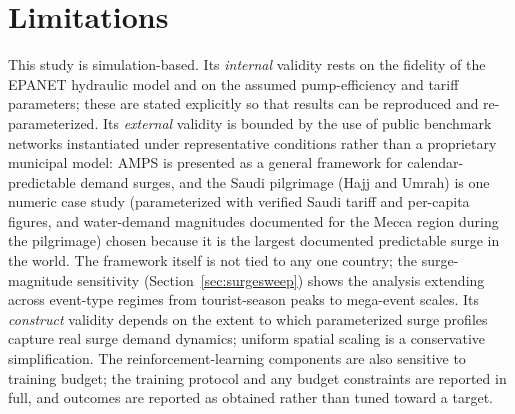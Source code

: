 \documentclass[11pt,a4paper]{article}
\begin{document}
\section{Limitations}
\label{sec:limitations}
This study is simulation-based. Its \emph{internal} validity rests on the
fidelity of the EPANET hydraulic model and on the assumed pump-efficiency and
tariff parameters; these are stated explicitly so that results can be
reproduced and re-parameterized. Its \emph{external} validity is bounded by the
use of public benchmark networks instantiated under representative conditions
rather than a proprietary municipal model: AMPS is presented as a general
framework for calendar-predictable demand surges, and the Saudi pilgrimage
(Hajj and Umrah) is one numeric case study (parameterized with verified Saudi
tariff and per-capita figures, and water-demand magnitudes documented for the
Mecca region during the pilgrimage) chosen because it is the largest documented
predictable surge in the world. The framework itself is not tied to any one
country; the surge-magnitude sensitivity (Section~\ref{sec:surgesweep}) shows
the analysis extending across event-type regimes from tourist-season peaks to
mega-event scales. Its \emph{construct} validity depends on the extent to which
parameterized surge profiles capture real surge demand dynamics; uniform
spatial scaling is a conservative simplification. The reinforcement-learning
components are also sensitive to training budget; the training protocol and any
budget constraints are reported in full, and outcomes are reported as obtained
rather than tuned toward a target.
\end{document}
